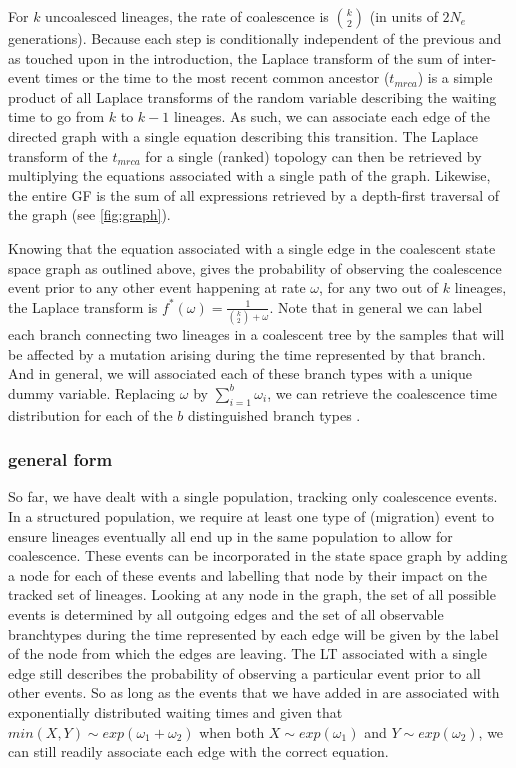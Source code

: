 \documentclass[10pt, a4]{article}
\begin{document}
For $k$ uncoalesced lineages, the rate of coalescence is ${k}\choose{2}$ (in units of $2N_e$ generations). Because each step is conditionally independent of the previous and as touched upon in the introduction, the Laplace transform of the sum of inter-event times or the time to the most recent common ancestor ($t_{mrca}$) is a simple product of all Laplace transforms of the random variable describing the waiting time to go from $k$ to $k-1$ lineages. As such, we can associate each edge of the directed graph with a single equation describing this transition. The Laplace transform of the $t_{mrca}$ for a single (ranked) topology can then be retrieved by multiplying the equations associated with a single path of the graph. Likewise, the entire GF is the sum of all expressions retrieved by a depth-first traversal of the graph (see \ref{fig:graph}). %

Knowing that the equation associated with a single edge in the coalescent state space graph as outlined above, gives the probability of observing the coalescence event prior to any other event happening at rate $\omega$, for any two out of $k$ lineages, the Laplace transform is $f^{*}(\omega) = \frac{1}{{k\choose{2}} + \omega}$. Note that in general we can label each branch connecting two lineages in a coalescent tree by the samples that will be affected by a mutation arising during the time represented by that branch. And in general, we will associated each of these branch types with a unique dummy variable. Replacing $\omega$ by $\sum_{i=1}^{b} \omega_i$, we can retrieve the coalescence time distribution for each of the $b$ distinguished branch types \citep{Lohse2011}. 

\subsubsection{general form}
So far, we have dealt with a single population, tracking only coalescence events. In a structured population, we require at least one type of (migration) event to ensure lineages eventually all end up in the same population to allow for coalescence. These events can be incorporated in the state space graph by adding a node for each of these events and labelling that node by their impact on the tracked set of lineages. Looking at any node in the graph, the set of all possible events is determined by all outgoing edges and the set of all observable branchtypes during the time represented by each edge will be given by the label of the node from which the edges are leaving. The LT associated with a single edge still describes the probability of observing a particular event prior to all other events. So as long as the events that we have added in are associated with exponentially distributed waiting times and given that $min(X, Y) \sim exp(\omega_1+\omega_2)$ when both $X \sim exp(\omega_1)$ and $Y \sim exp(\omega_2)$, we can still readily associate each edge with the correct equation.
\end{document}
